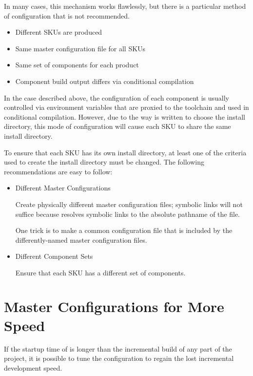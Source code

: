 In many cases, this mechanism works flawlessly, but there is a
particular method of configuration that is not recommended.

\begin{itemize}
\item{Different SKUs are produced}
\item{Same master configuration file for all SKUs}
\item{Same set of components for each product}
\item{Component build output differs via conditional compilation}
\end{itemize}

In the case described above, the configuration of each component is
usually controlled via environment variables that are proxied to the
toolchain and used in conditional compilation.  However, due to the
way \lmsbw is written to choose the install directory, this mode of
configuration will cause each SKU to share the same install directory.

To ensure that each SKU has its own install directory, at least one of
the criteria used to create the install directory must be changed.
The following recommendations are easy to follow:

\begin{itemize}
\item Different Master Configurations

  Create physically different master configuration files; symbolic links
  will not suffice because \lmsbw resolves symbolic links to the absolute
  pathname of the file.

  One trick is to make a common configuration file that is included by
  the differently-named master configuration files.

\item{Different Component Sets}

  Ensure that each SKU has a different set of components.
\end{itemize}

\section{Master Configurations for More Speed}

If the startup time of \lmsbw is longer than the incremental build of
any part of the project, it is possible to tune the configuration to
regain the lost incremental development speed.

